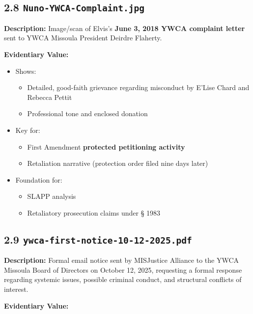 \documentclass[11pt, letterpaper]{article}
\begin{document}
\subsection{2.8 \texttt{Nuno-YWCA-Complaint.jpg}}

\textbf{Description:} Image/scan of Elvis's \textbf{June 3, 2018 YWCA complaint letter} sent to YWCA Missoula President Deirdre Flaherty.

\textbf{Evidentiary Value:}

\begin{itemize}[leftmargin=*]
  \item Shows:
    \begin{itemize}
      \item Detailed, good-faith grievance regarding misconduct by E'Lise Chard and Rebecca Pettit
      \item Professional tone and enclosed donation
    \end{itemize}
  \item Key for:
    \begin{itemize}
      \item First Amendment \textbf{protected petitioning activity}
      \item Retaliation narrative (protection order filed nine days later)
    \end{itemize}
  \item Foundation for:
    \begin{itemize}
      \item SLAPP analysis
      \item Retaliatory prosecution claims under \S{} 1983
    \end{itemize}
\end{itemize}



\subsection{2.9 \texttt{ywca-first-notice-10-12-2025.pdf}}

\textbf{Description:} Formal email notice sent by MISJustice Alliance to the YWCA Missoula Board of Directors on October 12, 2025, requesting a formal response regarding systemic issues, possible criminal conduct, and structural conflicts of interest.

\textbf{Evidentiary Value:}
\end{document}
